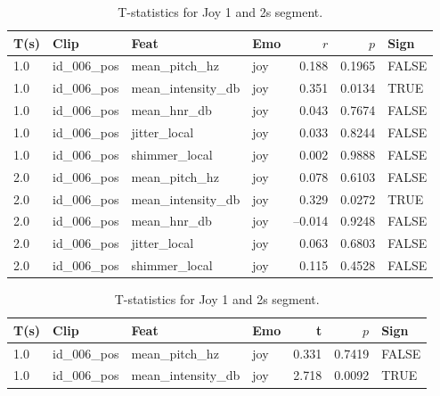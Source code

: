 \begin{table}[ht]
    \centering
    \begin{subtable}[t]{0.48\textwidth}
       \centering
  \caption{Pearson correlations for Joy, 1 and 2s segment.}
  \label{tab:pearson_joy_1s}
  \begin{tabular}{l l l l r r l}
    \toprule
    T(s) & Clip           & Feat             & Emo & $r$ & $p$ & Sign\\
    \midrule
    1.0  & id\_006\_pos   & mean\_pitch\_hz       & joy     & 0.188      & 0.1965    & FALSE       \\
    1.0  & id\_006\_pos   & mean\_intensity\_db   & joy     & 0.351      & 0.0134    & TRUE        \\
    1.0  & id\_006\_pos   & mean\_hnr\_db         & joy     & 0.043      & 0.7674    & FALSE       \\
    1.0  & id\_006\_pos   & jitter\_local         & joy     & 0.033      & 0.8244    & FALSE       \\
    1.0  & id\_006\_pos   & shimmer\_local        & joy     & 0.002      & 0.9888    & FALSE       \\
    2.0  & id\_006\_pos   & mean\_pitch\_hz     & joy     &  0.078 & 0.6103 & FALSE \\
    2.0  & id\_006\_pos   & mean\_intensity\_db & joy     &  0.329 & 0.0272 & TRUE  \\
    2.0  & id\_006\_pos   & mean\_hnr\_db       & joy     & –0.014 & 0.9248 & FALSE \\
    2.0  & id\_006\_pos   & jitter\_local       & joy     &  0.063 & 0.6803 & FALSE \\
    2.0  & id\_006\_pos   & shimmer\_local      & joy     &  0.115 & 0.4528 & FALSE \\
    \bottomrule
  \end{tabular}
    \end{subtable}
    \hfill
    \begin{subtable}[t]{0.48\textwidth}
        \centering
        \caption{T-statistics for Joy 1 and 2s segment.}
        \label{tab:ttest_joy_1s}
        \begin{tabular}{l l l l r r l}
          \toprule
          T(s) & Clip           & Feat            & Emo & t & $p$ & Sign \\
          \midrule
          1.0  & id\_006\_pos   & mean\_pitch\_hz       & joy     & 0.331        & 0.7419    & FALSE       \\
          1.0  & id\_006\_pos   & mean\_intensity\_db   & joy     & 2.718        & 0.0092    & TRUE        \\

\end{tabular}
\end{subtable}
\end{table}
